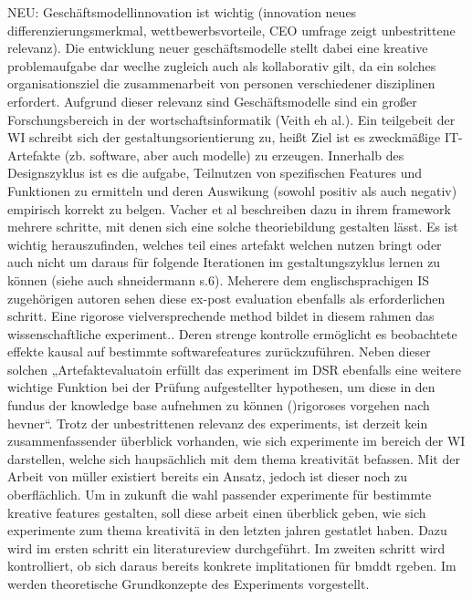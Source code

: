 NEU: Geschäftsmodellinnovation ist wichtig (innovation neues differenzierungsmerkmal, wettbewerbsvorteile, CEO umfrage zeigt unbestrittene relevanz).  Die entwicklung neuer geschäftsmodelle stellt dabei eine kreative problemaufgabe dar weclhe zugleich auch als kollaborativ gilt, da ein solches organisationsziel die zusammenarbeit von personen verschiedener disziplinen erfordert. Aufgrund dieser relevanz sind Geschäftsmodelle sind ein großer Forschungsbereich in der wortschaftsinformatik (Veith eh al.). Ein teilgebeit der WI schreibt sich der gestaltungsorientierung zu, heißt Ziel ist es zweckmäßige IT-Artefakte (zb. software, aber auch modelle) zu erzeugen. Innerhalb des Designszyklus ist es die aufgabe, Teilnutzen von spezifischen Features und Funktionen zu ermitteln und deren Auswikung (sowohl positiv als auch negativ) empirisch korrekt zu belgen. Vacher et al beschreiben dazu in ihrem framework mehrere schritte, mit denen sich eine solche theoriebildung gestalten lässt. Es ist wichtig herauszufinden, welches teil eines artefakt welchen nutzen bringt oder auch nicht um daraus für folgende Iterationen im gestaltungszyklus lernen zu können (siehe auch shneidermann s.6). Meherere dem englischsprachigen IS zugehörigen autoren sehen diese ex-post evaluation ebenfalls als erforderlichen schritt. Eine rigorose vielversprechende method bildet in diesem rahmen das wissenschaftliche experiment.. Deren strenge kontrolle ermöglicht es beobachtete effekte kausal auf bestimmte softwarefeatures zurückzuführen.
Neben dieser solchen „Artefaktevaluatoin erfüllt das experiment im DSR ebenfalls eine weitere wichtige Funktion bei der Prüfung aufgestellter hypothesen, um diese in den fundus der knowledge base aufnehmen zu können ()rigoroses vorgehen nach hevner“.
Trotz der unbestrittenen relevanz des experiments, ist derzeit kein zusammenfassender überblick vorhanden, wie sich experimente im bereich der WI darstellen, welche sich haupsächlich mit dem thema kreativität befassen. Mit der Arbeit von müller existiert bereits ein Ansatz, jedoch ist dieser noch zu oberflächlich.
Um in zukunft die wahl passender experimente für bestimmte kreative features gestalten, soll diese arbeit einen überblick geben, wie sich experimente zum thema kreativitä in den letzten jahren gestatlet haben. Dazu wird im ersten schritt ein literatureview durchgeführt. Im zweiten schritt wird kontrolliert, ob sich daraus bereits konkrete implitationen für bmddt rgeben. Im werden theoretische Grundkonzepte des Experiments vorgestellt.




